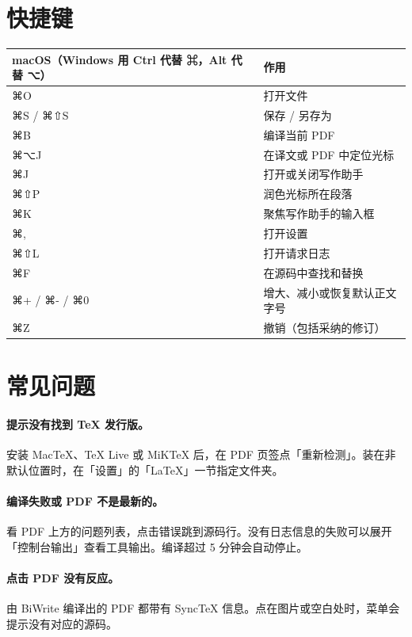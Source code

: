 \documentclass[UTF8,a4paper,11pt]{ctexart}
\newcommand{\cmdkey}{{\keysfont ⌘}}
\newcommand{\optkey}{{\keysfont ⌥}}
\newcommand{\shiftkey}{{\keysfont ⇧}}
\newcommand{\ui}[1]{「#1」}
\begin{document}
\section{快捷键}
\begin{center}
\begin{tabularx}{0.82\linewidth}{@{}lX@{}}
\toprule
macOS（Windows 用 Ctrl 代替 \cmdkey，Alt 代替 \optkey） & 作用 \\
\midrule
\cmdkey O & 打开文件 \\
\cmdkey S / \cmdkey\shiftkey S & 保存 / 另存为 \\
\cmdkey B & 编译当前 PDF \\
\cmdkey\optkey J & 在译文或 PDF 中定位光标 \\
\cmdkey J & 打开或关闭写作助手 \\
\cmdkey\shiftkey P & 润色光标所在段落 \\
\cmdkey K & 聚焦写作助手的输入框 \\
\cmdkey , & 打开设置 \\
\cmdkey\shiftkey L & 打开请求日志 \\
\cmdkey F & 在源码中查找和替换 \\
\cmdkey + / \cmdkey - / \cmdkey 0 & 增大、减小或恢复默认正文字号 \\
\cmdkey Z & 撤销（包括采纳的修订） \\
\bottomrule
\end{tabularx}
\end{center}

\section{常见问题}

\paragraph{提示没有找到 TeX 发行版。}安装 MacTeX、TeX Live 或 MiKTeX 后，在 PDF 页签点\ui{重新检测}。装在非默认位置时，在\ui{设置}的\ui{LaTeX}一节指定文件夹。

\paragraph{编译失败或 PDF 不是最新的。}看 PDF 上方的问题列表，点击错误跳到源码行。没有日志信息的失败可以展开\ui{控制台输出}查看工具输出。编译超过 5 分钟会自动停止。

\paragraph{点击 PDF 没有反应。}由 BiWrite 编译出的 PDF 都带有 SyncTeX 信息。点在图片或空白处时，菜单会提示没有对应的源码。
\end{document}
